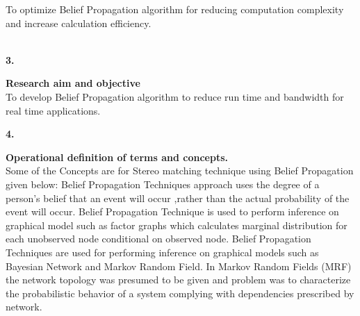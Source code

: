 {{{{{%
To optimize Belief Propagation algorithm  for reducing  computation complexity and increase calculation efficiency.\\\\
{\Large\textbf{3.} \vspace{0.5in} {\Large\textbf{Research aim and objective}\\
To develop Belief Propagation algorithm  to reduce run time and bandwidth for real time applications.\\
{\Large\textbf{4.} \vspace{0.5in} {\Large\textbf{Operational definition of terms and concepts.}\\
Some of the Concepts are for Stereo matching technique using Belief Propagation given  below:
Belief Propagation Techniques approach uses the degree of a person's belief that an event will occur ,rather than the actual probability  of the event will occur.
Belief Propagation Technique is used to perform inference on graphical  model  such as factor graphs which calculates marginal distribution for each unobserved node
conditional on observed node.
Belief Propagation Techniques  are used for performing inference on graphical models such as Bayesian Network and Markov Random Field. In Markov Random  Fields (MRF) the network topology was presumed to be given and problem was to characterize the probabilistic  behavior  of a system complying with dependencies prescribed by network.

}}}}}}}}}
